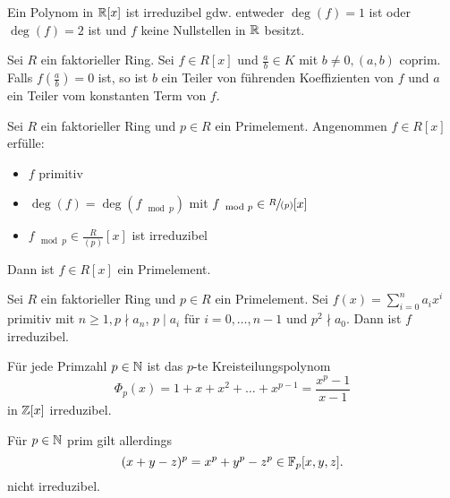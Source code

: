 \begin{corollary}
	Ein Polynom in $\mathbb{R}[x]$ ist irreduzibel gdw. entweder $\deg(f) = 1$ ist oder $\deg(f) = 2$ ist und $f$ keine Nullstellen in $\mathbb{R}$ besitzt.
\end{corollary}


\begin{proposition}
	Sei $R$ ein faktorieller Ring. Sei $f \in R[x]$ und $\frac{a}{b} \in K$ mit $b \neq 0, (a,b)$ coprim.
	Falls $f(\frac{a}{b}) = 0$ ist, so ist $b$ ein Teiler von führenden Koeffizienten von $f$ und $a$ ein Teiler vom konstanten Term von $f$.
\end{proposition}




\begin{proposition}
	Sei $R$ ein faktorieller Ring und $p \in R$ ein Primelement.
	Angenommen $f \in R[x]$ erfülle:
	\begin{itemize}
		\item $f$ primitiv
		\item $\deg(f) = \deg(f_{\mod p})$ mit $f_{\mod p} \in \sfrac{R}{(p)}[x]$
		\item $f_{\mod p} \in \frac{R}{(p)} [x]$ ist irreduzibel
	\end{itemize}
	Dann ist $f \in R[x]$ ein Primelement.
\end{proposition}



\begin{theorem}
	Sei $R$ ein faktorieller Ring und $p \in R$ ein Primelement.
	Sei $f(x) = \sum_{i=0}^{n} a_{i} x^{i}$  primitiv mit $n \geq 1, p \nmid a_{n}$, $p \mid a_{i}$ für $i = 0,\ldots,n-1$ und $p^2 \nmid a_0$.
	Dann ist $f$ irreduzibel.
\end{theorem}



\begin{corollary}
	Für jede Primzahl $p \in \mathbb{N}$ ist das $p$-te Kreisteilungspolynom
	\[
		\Phi_{p}(x) = 1 + x+ x^2 + \ldots + x^{p-1} = \frac{x^{p} -1}{x-1}
	\] 
	in $\mathbb{Z}[x]$ irreduzibel.
\end{corollary}



\begin{remark}
	Für $p \in \mathbb{N}$ prim gilt allerdings
	\[
		(x+y-z)^{p} = x^{p} + y^{p} - z^{p} \in \mathbb{F}_{p}[x,y,z]
	.\]
	nicht irreduzibel.
\end{remark}


















